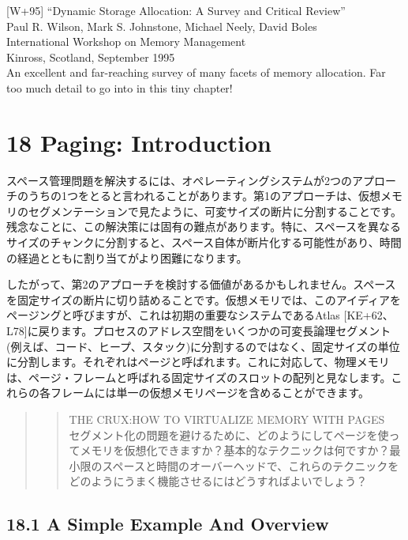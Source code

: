 {[}W+95{]} ``Dynamic Storage Allocation: A Survey and Critical
Review''\\
Paul R. Wilson, Mark S. Johnstone, Michael Neely, David Boles\\
International Workshop on Memory Management\\
Kinross, Scotland, September 1995\\
An excellent and far-reaching survey of many facets of memory
allocation. Far too much detail to go into in this tiny chapter!

\newpage

\hypertarget{paging-introduction}{%
\section*{18 Paging: Introduction}\label{paging-introduction}}

スペース管理問題を解決するには、オペレーティングシステムが2つのアプローチのうちの1つをとると言われることがあります。第1のアプローチは、仮想メモリのセグメンテーションで見たように、可変サイズの断片に分割することです。残念なことに、この解決策には固有の難点があります。特に、スペースを異なるサイズのチャンクに分割すると、スペース自体が断片化する可能性があり、時間の経過とともに割り当てがより困難になります。

したがって、第2のアプローチを検討する価値があるかもしれません。スペースを固定サイズの断片に切り詰めることです。仮想メモリでは、このアイディアをページングと呼びますが、これは初期の重要なシステムであるAtlas
{[}KE+62、L78{]}に戻ります。プロセスのアドレス空間をいくつかの可変長論理セグメント(例えば、コード、ヒープ、スタック)に分割するのではなく、固定サイズの単位に分割します。それぞれはページと呼ばれます。これに対応して、物理メモリは、ページ・フレームと呼ばれる固定サイズのスロットの配列と見なします。これらの各フレームには単一の仮想メモリページを含めることができます。

\begin{quote}
\begin{quote}
THE CRUX:HOW TO VIRTUALIZE MEMORY WITH PAGES\\
セグメント化の問題を避けるために、どのようにしてページを使ってメモリを仮想化できますか？基本的なテクニックは何ですか？最小限のスペースと時間のオーバーヘッドで、これらのテクニックをどのようにうまく機能させるにはどうすればよいでしょう？
\end{quote}
\end{quote}

\hypertarget{a-simple-example-and-overview}{%
\subsection*{18.1 A Simple Example And
Overview}\label{a-simple-example-and-overview}}

